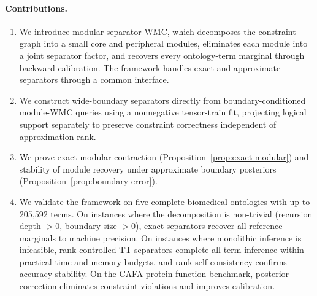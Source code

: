 \paragraph{Contributions.}
\begin{enumerate}
  \item We introduce modular separator WMC, which decomposes the
  constraint graph into a small core and peripheral modules, eliminates
  each module into a joint separator factor, and recovers every
  ontology-term marginal through backward calibration. The framework
  handles exact and approximate separators through a common interface.

  \item We construct wide-boundary separators directly from
  boundary-conditioned module-WMC queries using a nonnegative
  tensor-train fit, projecting logical support separately to preserve
  constraint correctness independent of approximation rank.

  \item We prove exact modular contraction
  (Proposition~\ref{prop:exact-modular}) and stability of module
  recovery under approximate boundary posteriors
  (Proposition~\ref{prop:boundary-error}).

  \item We validate the framework on five complete biomedical ontologies
  with up to 205,592 terms. On instances where the decomposition is
  non-trivial (recursion depth $> 0$, boundary size $> 0$), exact
  separators recover all reference marginals to machine precision. On
  instances where monolithic inference is infeasible, rank-controlled
  TT separators complete all-term inference within practical time and
  memory budgets, and rank self-consistency confirms accuracy stability.
  On the CAFA protein-function benchmark, posterior correction
  eliminates constraint violations and improves calibration.
\end{enumerate}

